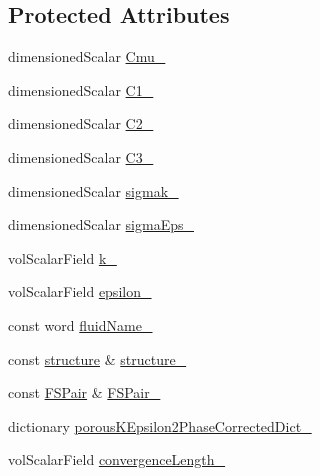 \subsection*{Protected Attributes}
\begin{DoxyCompactItemize}
\item 
dimensioned\+Scalar \hyperlink{classFoam_1_1RASModels_1_1porousKEpsilon2PhaseCorrected_aca8750ac64529f08a5e0ddbd69d538db}{Cmu\+\_\+}
\item 
dimensioned\+Scalar \hyperlink{classFoam_1_1RASModels_1_1porousKEpsilon2PhaseCorrected_a25ef984db7a92f8f2421ed817e616206}{C1\+\_\+}
\item 
dimensioned\+Scalar \hyperlink{classFoam_1_1RASModels_1_1porousKEpsilon2PhaseCorrected_a6ecae7b56fdac924dca1bf174f157f69}{C2\+\_\+}
\item 
dimensioned\+Scalar \hyperlink{classFoam_1_1RASModels_1_1porousKEpsilon2PhaseCorrected_aed8039605824e63ab9ac285e15c70bb7}{C3\+\_\+}
\item 
dimensioned\+Scalar \hyperlink{classFoam_1_1RASModels_1_1porousKEpsilon2PhaseCorrected_a1c4d80e34d39e7ffccd625df6016b6f7}{sigmak\+\_\+}
\item 
dimensioned\+Scalar \hyperlink{classFoam_1_1RASModels_1_1porousKEpsilon2PhaseCorrected_a2f26c65464368e5619b31aa5d5392a19}{sigma\+Eps\+\_\+}
\item 
vol\+Scalar\+Field \hyperlink{classFoam_1_1RASModels_1_1porousKEpsilon2PhaseCorrected_a2166e9ffd139700fb0f21c44414e3545}{k\+\_\+}
\item 
vol\+Scalar\+Field \hyperlink{classFoam_1_1RASModels_1_1porousKEpsilon2PhaseCorrected_a027dddd791551bd248d0fcacb013dd68}{epsilon\+\_\+}
\item 
const word \hyperlink{classFoam_1_1RASModels_1_1porousKEpsilon2PhaseCorrected_a833e83efda396d14fa3d66c52df80ee4}{fluid\+Name\+\_\+}
\item 
const \hyperlink{classFoam_1_1structure}{structure} \& \hyperlink{classFoam_1_1RASModels_1_1porousKEpsilon2PhaseCorrected_a036e5523c5ec733c6115d5f2b7446583}{structure\+\_\+}
\item 
const \hyperlink{classFoam_1_1FSPair}{F\+S\+Pair} \& \hyperlink{classFoam_1_1RASModels_1_1porousKEpsilon2PhaseCorrected_a9b97bb673e337335c3a0b01549b3667f}{F\+S\+Pair\+\_\+}
\item 
dictionary \hyperlink{classFoam_1_1RASModels_1_1porousKEpsilon2PhaseCorrected_a7cce73b8350efa216b6e484b7fcbf021}{porous\+K\+Epsilon2\+Phase\+Corrected\+Dict\+\_\+}
\item 
vol\+Scalar\+Field \hyperlink{classFoam_1_1RASModels_1_1porousKEpsilon2PhaseCorrected_abab8e904bd578faa6c7100b6c2e55b1a}{convergence\+Length\+\_\+}

\end{DoxyCompactItemize}
